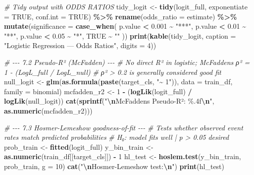 \documentclass[
]{article}
\newenvironment{Shaded}{\begin{snugshade}}{\end{snugshade}}
\newcommand{\AttributeTok}[1]{\textcolor[rgb]{0.13,0.29,0.53}{#1}}
\newcommand{\CommentTok}[1]{\textcolor[rgb]{0.56,0.35,0.01}{\textit{#1}}}
\newcommand{\ConstantTok}[1]{\textcolor[rgb]{0.56,0.35,0.01}{#1}}
\newcommand{\DecValTok}[1]{\textcolor[rgb]{0.00,0.00,0.81}{#1}}
\newcommand{\FloatTok}[1]{\textcolor[rgb]{0.00,0.00,0.81}{#1}}
\newcommand{\FunctionTok}[1]{\textcolor[rgb]{0.13,0.29,0.53}{\textbf{#1}}}
\newcommand{\NormalTok}[1]{#1}
\newcommand{\OtherTok}[1]{\textcolor[rgb]{0.56,0.35,0.01}{#1}}
\newcommand{\SpecialCharTok}[1]{\textcolor[rgb]{0.81,0.36,0.00}{\textbf{#1}}}
\newcommand{\StringTok}[1]{\textcolor[rgb]{0.31,0.60,0.02}{#1}}
\begin{document}
\begin{Shaded}
\begin{Highlighting}[]
  \CommentTok{\# Tidy output with ODDS RATIOS}
\NormalTok{  tidy\_logit }\OtherTok{\textless{}{-}} \FunctionTok{tidy}\NormalTok{(logit\_full, }\AttributeTok{exponentiate =} \ConstantTok{TRUE}\NormalTok{, }\AttributeTok{conf.int =} \ConstantTok{TRUE}\NormalTok{) }\SpecialCharTok{\%\textgreater{}\%}
    \FunctionTok{rename}\NormalTok{(}\AttributeTok{odds\_ratio =}\NormalTok{ estimate) }\SpecialCharTok{\%\textgreater{}\%}
    \FunctionTok{mutate}\NormalTok{(}\AttributeTok{significance =} \FunctionTok{case\_when}\NormalTok{(}
\NormalTok{      p.value }\SpecialCharTok{\textless{}} \FloatTok{0.001} \SpecialCharTok{\textasciitilde{}} \StringTok{"***"}\NormalTok{,}
\NormalTok{      p.value }\SpecialCharTok{\textless{}} \FloatTok{0.01}  \SpecialCharTok{\textasciitilde{}} \StringTok{"**"}\NormalTok{,}
\NormalTok{      p.value }\SpecialCharTok{\textless{}} \FloatTok{0.05}  \SpecialCharTok{\textasciitilde{}} \StringTok{"*"}\NormalTok{,}
      \ConstantTok{TRUE}            \SpecialCharTok{\textasciitilde{}} \StringTok{""}
\NormalTok{    ))}
  \FunctionTok{print}\NormalTok{(}\FunctionTok{kable}\NormalTok{(tidy\_logit, }\AttributeTok{caption =} \StringTok{"Logistic Regression — Odds Ratios"}\NormalTok{, }\AttributeTok{digits =} \DecValTok{4}\NormalTok{))}

  \CommentTok{\# {-}{-}{-} 7.2  Pseudo{-}R² (McFadden) {-}{-}{-}}
  \CommentTok{\# No direct R² in logistic; McFadden\textquotesingle{}s ρ² = 1 {-} (LogL\_full / LogL\_null)}
  \CommentTok{\# ρ² \textgreater{} 0.2 is generally considered good fit}
\NormalTok{  null\_logit  }\OtherTok{\textless{}{-}} \FunctionTok{glm}\NormalTok{(}\FunctionTok{as.formula}\NormalTok{(}\FunctionTok{paste}\NormalTok{(target\_cls, }\StringTok{"\textasciitilde{} 1"}\NormalTok{)),}
                      \AttributeTok{data =}\NormalTok{ train\_df, }\AttributeTok{family =}\NormalTok{ binomial)}
\NormalTok{  mcfadden\_r2 }\OtherTok{\textless{}{-}} \DecValTok{1} \SpecialCharTok{{-}}\NormalTok{ (}\FunctionTok{logLik}\NormalTok{(logit\_full) }\SpecialCharTok{/} \FunctionTok{logLik}\NormalTok{(null\_logit))}
  \FunctionTok{cat}\NormalTok{(}\FunctionTok{sprintf}\NormalTok{(}\StringTok{"}\SpecialCharTok{\textbackslash{}n}\StringTok{McFadden\textquotesingle{}s Pseudo{-}R²: \%.4f}\SpecialCharTok{\textbackslash{}n}\StringTok{"}\NormalTok{, }\FunctionTok{as.numeric}\NormalTok{(mcfadden\_r2)))}

  \CommentTok{\# {-}{-}{-} 7.3  Hosmer{-}Lemeshow goodness{-}of{-}fit {-}{-}{-}}
  \CommentTok{\# Tests whether observed event rates match predicted probabilities}
  \CommentTok{\# H₀: model fits well  |  p \textgreater{} 0.05 desired}
\NormalTok{  prob\_train }\OtherTok{\textless{}{-}} \FunctionTok{fitted}\NormalTok{(logit\_full)}
\NormalTok{  y\_bin\_train }\OtherTok{\textless{}{-}} \FunctionTok{as.numeric}\NormalTok{(train\_df[[target\_cls]]) }\SpecialCharTok{{-}} \DecValTok{1}
\NormalTok{  hl\_test }\OtherTok{\textless{}{-}} \FunctionTok{hoslem.test}\NormalTok{(y\_bin\_train, prob\_train, }\AttributeTok{g =} \DecValTok{10}\NormalTok{)}
  \FunctionTok{cat}\NormalTok{(}\StringTok{"}\SpecialCharTok{\textbackslash{}n}\StringTok{Hosmer{-}Lemeshow test:}\SpecialCharTok{\textbackslash{}n}\StringTok{"}\NormalTok{)}
  \FunctionTok{print}\NormalTok{(hl\_test)}


\end{Highlighting}
\end{Shaded}
\end{document}
